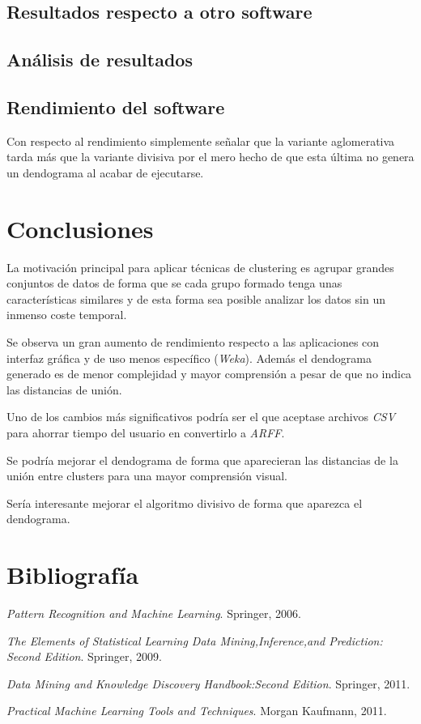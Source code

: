 \documentclass[11pt, titlepage,a4paper]{article}
\begin{document}
\subsection{Resultados respecto a otro software}

\subsection{Análisis de resultados}


\subsection{Rendimiento del software}
Con respecto al rendimiento simplemente señalar que la variante aglomerativa
tarda más que la variante divisiva por el mero hecho de que esta última no
genera un dendograma al acabar de ejecutarse.

\section{Conclusiones}
La motivación principal para aplicar técnicas de clustering es agrupar grandes
conjuntos de datos de forma que se cada grupo formado tenga unas características similares y de esta forma sea posible analizar los datos sin un inmenso coste temporal.

Se observa un gran aumento de rendimiento respecto a las aplicaciones con
interfaz gráfica y de uso menos específico (\textit{Weka}). Además el dendograma generado es de menor complejidad y mayor comprensión a pesar de que no indica las distancias de unión.

Uno de los cambios más significativos podría ser el que aceptase archivos
\textit{CSV} para ahorrar tiempo del usuario en convertirlo a \textit{ARFF}.
 
Se podría mejorar el dendograma de forma que aparecieran las distancias de la
unión entre clusters para una mayor comprensión visual. 

Sería interesante mejorar el algoritmo divisivo de forma que aparezca el
dendograma.

\section{Bibliografía}
\renewcommand{\refname}{\ }

\begin{thebibliography}{1}
	
	{\em Pattern Recognition and Machine Learning}.
	\newblock Springer, 2006.
	
	{\em The Elements of Statistical Learning Data Mining,Inference,and Prediction:
		Second Edition}.
	\newblock Springer, 2009.
	
	{\em Data Mining and Knowledge Discovery Handbook:Second Edition}.
	\newblock Springer, 2011.
	
	{\em Practical Machine Learning Tools and Techniques}.
	\newblock Morgan Kaufmann, 2011.
	
\end{thebibliography}
\end{document}
